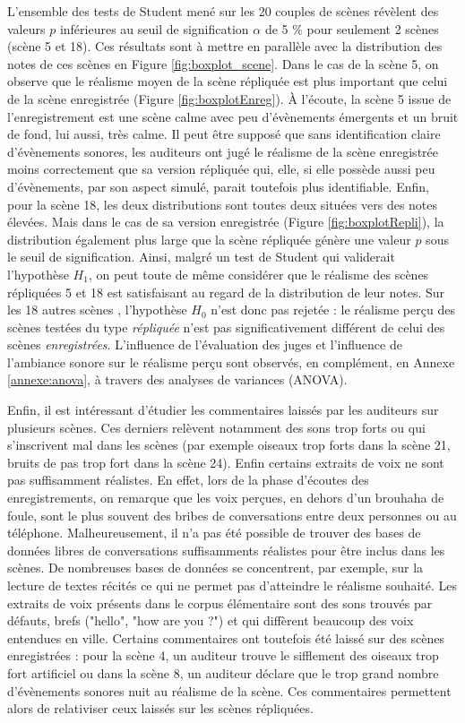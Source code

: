 {L'ensemble des tests de Student mené sur les 20 couples de scènes révèlent des valeurs $p$ inférieures au seuil de signification $\alpha$ de 5 $\%$ pour seulement 2 scènes (scène 5 et 18). Ces résultats sont à mettre en parallèle avec la distribution des notes de ces scènes en Figure \ref{fig:boxplot_scene}. Dans le cas de la scène 5, on observe que le réalisme moyen de la scène répliquée est plus important que celui de la scène enregistrée (Figure \ref{fig:boxplotEnreg}). À l'écoute, la scène 5 issue de l'enregistrement est une scène calme avec peu d'évènements émergents et un bruit de fond, lui aussi, très calme. Il peut être supposé que sans identification claire d'évènements sonores, les auditeurs ont jugé le réalisme de la scène enregistrée moins correctement que sa version répliquée qui, elle, si elle possède aussi peu d'évènements, par son aspect simulé, parait toutefois plus identifiable.
Enfin, pour la scène 18, les deux distributions sont toutes deux situées vers des notes élevées. Mais dans le cas de sa version enregistrée (Figure \ref{fig:boxplotRepli}), la distribution également plus large que la scène répliquée génère une valeur $p$ sous le seuil de signification. Ainsi, malgré un test de Student qui validerait l'hypothèse $H_1$, on peut toute de même considérer que le réalisme des scènes répliquées 5 et 18 est satisfaisant au regard de la distribution de leur notes.
Sur les 18 autres scènes , l'hypothèse $H_0$ n'est donc pas rejetée : le réalisme perçu des scènes testées du type \textit{répliquée} n'est pas significativement différent de celui des scènes \textit{enregistrées}. L'influence de l'évaluation des juges et l'influence de l'ambiance sonore sur le réalisme perçu sont observés, en complément, en Annexe \ref{annexe:anova}, à travers des analyses de variances (ANOVA).

Enfin, il est intéressant d'étudier les commentaires laissés par les auditeurs sur plusieurs scènes. Ces derniers relèvent notamment des sons trop forts ou qui s'inscrivent mal dans les scènes (par exemple oiseaux trop forts dans la scène 21, bruits de pas trop fort dans la scène 24). Enfin certains extraits de voix ne sont pas suffisamment réalistes. En effet, lors de la phase d'écoutes des enregistrements, on remarque que les voix perçues, en dehors d'un brouhaha de foule, sont le plus souvent des bribes de conversations entre deux personnes ou au téléphone. Malheureusement, il n'a pas été possible de trouver des bases de données libres de conversations suffisamments réalistes pour être inclus dans les scènes. De nombreuses bases de données se concentrent, par exemple, sur la lecture de textes récités \cite{el2011survey, kominek2004cmu, barker2015third} ce qui ne permet pas d'atteindre le réalisme souhaité. Les extraits de voix présents dans le corpus élémentaire sont des sons trouvés par défauts, brefs ("hello", "how are you ?") et qui diffèrent beaucoup des voix entendues en ville.
Certains commentaires ont toutefois été laissé sur des scènes enregistrées : pour la scène 4, un auditeur trouve le sifflement des oiseaux trop fort \og artificiel \fg ou dans la scène 8, un auditeur déclare que le trop grand nombre d'évènements sonores nuit au réalisme de la scène. Ces commentaires permettent alors de relativiser ceux laissés sur les scènes répliquées.

}
